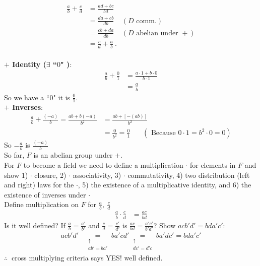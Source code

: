\begin{theorem}
    \begin{align}
        \frac{a}{b}+\frac{c}{d}&= \frac{ad+bc}{bd}\nonumber \\
        &= \frac{da+cb}{db} \ \ \ \ \ (D \text{ comm.}) \nonumber \\
        &= \frac{cb+da}{db} \ \ \ \ \ (D \text{ abelian under }+) \nonumber \\
        &= \frac{c}{d}+\frac{a}{b} \ . \nonumber
    \end{align}\\
    \noindent \textbf{$+$ Identity ($\exists$ ``$0$" )}: \\
    \begin{align}
        \frac{a}{b}+\frac{0}{1} &= \frac{a\cdot 1 + b\cdot 0}{b\cdot 1} \nonumber \\
        &= \frac{a}{b} \nonumber
    \end{align}
    So we have a ``$0$" it is $\frac{0}{1}$.\\
    \noindent \textbf{$+$ Inverses}: \\ 
    \begin{align}
        \frac{a}{b}+\frac{(-a)}{b} = \frac{ab+b(-a)}{b^2} &= \frac{ab+[-(ab)]}{b^2} \nonumber \\
        &= \frac{0}{b^2} = \frac{0}{1} \ \ \ \ \ \ \ \ (\text{ Because }0\cdot 1 = b^2 \cdot 0 = 0) \nonumber
    \end{align}
    So $-\frac{a}{b}$ is $\frac{(-a)}{b}$
    \steezybreak \\
    So far, $F$ is an abelian group under $+$.  \steezybreak \\
    For $F$ to become a field we need to define a multiplication $\cdot$ for elements in $F$ and show 1) $\cdot$ closure, 2) $\cdot$ associativity, 3) $\cdot$ commutativity, 4) two distribution (left and right) laws for the $\cdot$, 5) the existence of a multiplicative identity, and 6) the existence of inverses under $\cdot$ \steezybreak \\
    Define multiplication on $F$ for $\frac{a}{b}, \ \frac{c}{d}$
    \begin{align}
        \frac{a}{b} \cdot \frac{c}{d}&= \frac{ac}{bd} \nonumber
    \end{align}
    Is it well defined? If $\frac{a}{b}=\frac{a'}{b'}$ and $\frac{c}{d}=\frac{c'}{d'}$ is $\frac{ac}{bd}=\frac{a'c'}{b'd'}$? Show $acb'd'=bda'c'$:
    \begin{align}
        acb'd'&\underset{\substack{\uparrow \\ ab'=ba'}}{=}ba'cd'\underset{\substack{\uparrow \\ dc'=d'c}}{=}ba'dc'=bda'c'\nonumber 
    \end{align}
    $\therefore \ $ cross multiplying criteria says YES! well defined.


\end{theorem}
